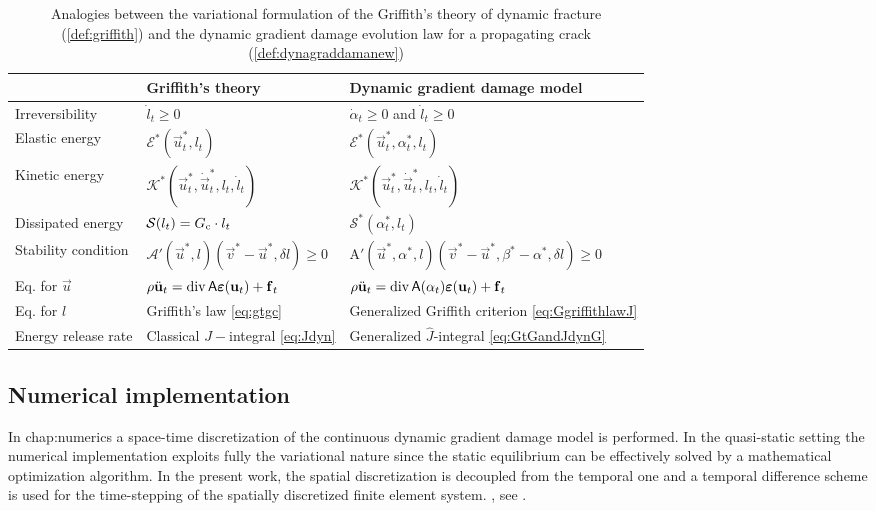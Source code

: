 \begin{table}[htbp]
\caption{Analogies between the variational formulation of the Griffith's theory of dynamic fracture (\cref{def:griffith}) and the dynamic gradient damage evolution law for a propagating crack (\cref{def:dynagraddamanew})} \label{tab:analogy}
\centering
\begin{tabular}{lll} \toprule
 & Griffith's theory & Dynamic gradient damage model \\ \midrule
Irreversibility & $\dot{l}_t\geq 0$ & $\dot{\alpha}_t\geq 0$ and $\dot{l}_t\geq 0$ \\
Elastic energy & $\mathcal{E}^*(\vec{u}^*_t,l_t)$ & $\mathcal{E}^*(\vec{u}^*_t,\alpha^*_t,l_t)$ \\
Kinetic energy & $\mathcal{K}^*(\vec{u}_t^*,\dot{\vec{u}}_t^*,l_t,\dot{l}_t)$ & $\mathcal{K}^*(\vec{u}_t^*,\dot{\vec{u}}_t^*,l_t,\dot{l}_t)$ \\
Dissipated energy & $\mathcal{S}(l_t)=G_\mathrm{c}\cdot l_t$ & $\mathcal{S}^*(\alpha^*_t,l_t)$ \\
Stability condition & $\mathcal{A}'(\vec{u}^*,l)(\vec{v}^*-\vec{u}^*,\delta l)\geq 0$ & $\mathrm{A}'(\vec{u}^*,\alpha^*,l)(\vec{v}^*-\vec{u}^*,\beta^*-\alpha^*,\delta l)\geq 0$ \\
Eq. for $\vec{u}$ & $\rho\ddot{\vec{u}}_t=\div\tens{A}\eps(\vec{u}_t)+\vec{f}_t$ & $\rho\ddot{\vec{u}}_t=\div\tens{A}(\alpha_t)\eps(\vec{u}_t)+\vec{f}_t$ \\
Eq. for $l$ & Griffith's law \eqref{eq:gtgc} & Generalized Griffith criterion \eqref{eq:GgriffithlawJ} \\
Energy release rate & Classical $J-$integral \eqref{eq:Jdyn} & Generalized $\widehat{J}$-integral \eqref{eq:GtGandJdynG} \\ \bottomrule
\end{tabular}
\end{table}

\subsection{Numerical implementation}
In {chap:numerics} a space-time discretization of the continuous dynamic gradient damage model is performed. In the quasi-static setting the numerical implementation exploits fully the variational nature since the static equilibrium can be effectively solved by a mathematical optimization algorithm. In the present work, the spatial discretization is decoupled from the temporal one and a temporal difference scheme is used for the time-stepping of the spatially discretized finite element system. , see \cite{HughesHulbert:1988}.


